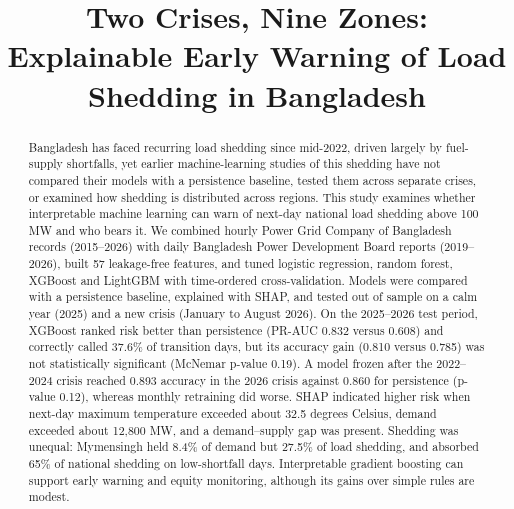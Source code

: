 \documentclass[conference]{IEEEtran}
\begin{document}
\title{Two Crises, Nine Zones: Explainable Early Warning of Load Shedding in Bangladesh}

\author{
\and
{}
}

\maketitle

\begin{abstract}
Bangladesh has faced recurring load shedding since mid-2022, driven largely by fuel-supply shortfalls, yet earlier machine-learning studies of this shedding have not compared their models with a persistence baseline, tested them across separate crises, or examined how shedding is distributed across regions. This study examines whether interpretable machine learning can warn of next-day national load shedding above 100 MW and who bears it. We combined hourly Power Grid Company of Bangladesh records (2015--2026) with daily Bangladesh Power Development Board reports (2019--2026), built 57 leakage-free features, and tuned logistic regression, random forest, XGBoost and LightGBM with time-ordered cross-validation. Models were compared with a persistence baseline, explained with SHAP, and tested out of sample on a calm year (2025) and a new crisis (January to August 2026). On the 2025--2026 test period, XGBoost ranked risk better than persistence (PR-AUC 0.832 versus 0.608) and correctly called 37.6\% of transition days, but its accuracy gain (0.810 versus 0.785) was not statistically significant (McNemar p-value 0.19). A model frozen after the 2022--2024 crisis reached 0.893 accuracy in the 2026 crisis against 0.860 for persistence (p-value 0.12), whereas monthly retraining did worse. SHAP indicated higher risk when next-day maximum temperature exceeded about 32.5 degrees Celsius, demand exceeded about 12,800 MW, and a demand--supply gap was present. Shedding was unequal: Mymensingh held 8.4\% of demand but 27.5\% of load shedding, and absorbed 65\% of national shedding on low-shortfall days. Interpretable gradient boosting can support early warning and equity monitoring, although its gains over simple rules are modest.
\end{abstract}
\end{document}
